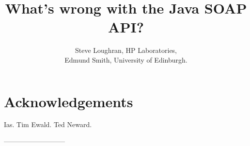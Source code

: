 \documentclass[draft]{article}
\begin{document}




\title{What's wrong with the Java SOAP API?}
\author{
    Steve Loughran, HP Laboratories,\\
    Edmund Smith, University of Edinburgh. 
    }
\maketitle








\section{Acknowledgements}

Ias. Tim Ewald. Ted Neward.  


---------------------------







\onecolumn

%


\end{document}
